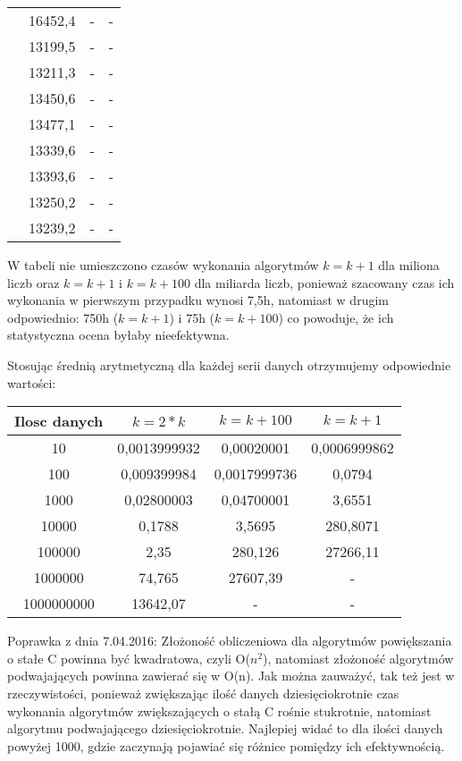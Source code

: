 \documentclass[10pt, a4paper]{article}
\begin{document}
\begin{flushleft}
\begin{table}[h]
\begin{tabular}{|c|c|c|c|}
 & 16452,4 & - & - \\
 & 13199,5 & - & - \\
 & 13211,3 & - & - \\
 & 13450,6 & - & - \\
 & 13477,1 & - & - \\
 & 13339,6 & - & - \\
 & 13393,6 & - & - \\
 & 13250,2 & - & - \\
 & 13239,2 & - & - \\ \hline
\end{tabular}
\end{table}

W tabeli nie umieszczono czasów wykonania algorytmów $k=k+1$ dla miliona liczb oraz $k=k+1$ i $k=k+100$ dla miliarda liczb, ponieważ szacowany czas ich wykonania w pierwszym przypadku wynosi 7,5h, natomiast w drugim odpowiednio: 750h ($k=k+1$) i 75h ($k=k+100$) co powoduje, że ich statystyczna ocena byłaby nieefektywna.

\newpage

Stosując średnią arytmetyczną dla każdej serii danych otrzymujemy odpowiednie wartości:
\begin{table}[h]
\centering
\begin{tabular}{|c|c|c|c|} \hline
Ilosc danych & $k=2*k$ & $k=k+100$ & $k=k+1$ \\ \hline
10 & 0,0013999932 & 0,00020001 & 0,0006999862 \\ \hline
100 & 0,009399984 & 0,0017999736 & 0,0794 \\ \hline
1000 & 0,02800003 & 0,04700001 & 3,6551 \\ \hline
10000 & 0,1788 & 3,5695 & 280,8071 \\ \hline
100000 & 2,35 & 280,126 & 27266,11 \\ \hline
1000000 & 74,765 & 27607,39 & - \\ \hline
1000000000 & 13642,07 & - & - \\ \hline
\end{tabular}
\end{table} \newline

Poprawka z dnia 7.04.2016: \newline
Złożoność obliczeniowa dla algorytmów powiększania o stałe C powinna być kwadratowa, czyli O($n^2$), natomiast złożoność algorytmów podwajających powinna zawierać się w O(n). Jak można zauważyć, tak też jest w rzeczywistości, ponieważ zwiększając ilość danych dziesięciokrotnie czas wykonania algorytmów zwiększających o stałą C rośnie stukrotnie, natomiast algorytmu podwajającego dziesięciokrotnie. Najlepiej widać to dla ilości danych powyżej 1000, gdzie zaczynają pojawiać się różnice pomiędzy ich efektywnością. \newline


\end{flushleft}
\end{document}
